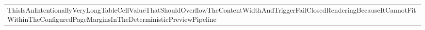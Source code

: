 \documentclass{article}
\begin{document}
\begin{tabular}{l}
ThisIsAnIntentionallyVeryLongTableCellValueThatShouldOverflowTheContentWidthAndTriggerFailClosedRenderingBecauseItCannotFitWithinTheConfiguredPageMarginsInTheDeterministicPreviewPipeline\\
\end{tabular}
\end{document}
